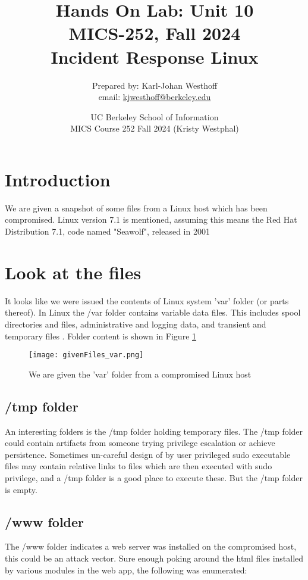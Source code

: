\documentclass[
	letterpaper, %
	10pt, %
	unnumberedsections, %
	twoside, %
]{APAAssignment}
\title{Hands On Lab: Unit 10 \\ MICS-252, Fall 2024 \\ Incident Response Linux} %
\date{UC Berkeley School of Information \\
MICS Course 252 Fall 2024 (Kristy Westphal)
}
\author{
	Prepared by: Karl-Johan Westhoff \\
	email: \href{mailto:kjwesthoff@berkeley.edu}{kjwesthoff@berkeley.edu}
}
\begin{document}
\onecolumn
\maketitle %



\section{Introduction}
We are given a snapshot of some files from a Linux host which has been compromised.
Linux version 7.1 is mentioned, assuming this means the Red Hat Distribution 7.1, code named "Seawolf", released in 2001 \cite{RedHatOnWIki}

\section{Look at the files}
It looks like we were issued the contents of Linux system 'var' folder (or parts thereof). In Linux the /var folder contains variable data files. This includes spool directories and files, administrative and logging data, and transient and temporary files \cite{VarFolder}. Folder content is shown in Figure \ref{fig:givenFiles}

\begin{figure}[!htp] %
	\centering
	\texttt{[image: givenFiles\_var.png]}
	\caption{We are given the 'var' folder from a compromised Linux host}
	\label{fig:givenFiles}
\end{figure}

\subsection{/tmp folder}
An interesting folders is the /tmp folder holding temporary files. The /tmp folder could contain artifacts from someone trying privilege escalation or achieve persistence. Sometimes un-careful design of by user privileged sudo executable files may contain relative links to files which are then executed with sudo privilege, and a /tmp folder is a good place to execute these. But the /tmp folder is empty.

\subsection{/www folder}
The /www folder indicates a web server was installed on the compromised host, this could be an attack vector. Sure enough poking around the html files installed by various modules in the web app, the following was enumerated:
\end{document}
